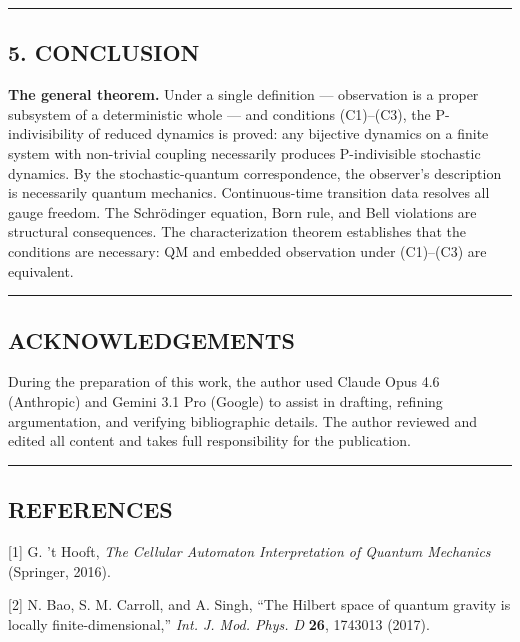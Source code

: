 \documentclass[
]{article}
\begin{document}
\begin{center}\rule{0.5\linewidth}{0.5pt}\end{center}

\hypertarget{conclusion}{%
\subsection{5. CONCLUSION}\label{conclusion}}

\textbf{The general theorem.} Under a single definition --- observation
is a proper subsystem of a deterministic whole --- and conditions
(C1)--(C3), the P-indivisibility of reduced dynamics is proved: any
bijective dynamics on a finite system with non-trivial coupling
necessarily produces P-indivisible stochastic dynamics. By the
stochastic-quantum correspondence, the observer's description is
necessarily quantum mechanics. Continuous-time transition data resolves
all gauge freedom. The Schrödinger equation, Born rule, and Bell
violations are structural consequences. The characterization theorem
establishes that the conditions are necessary: QM and embedded
observation under (C1)--(C3) are equivalent.

\begin{center}\rule{0.5\linewidth}{0.5pt}\end{center}

\hypertarget{acknowledgements}{%
\subsection{ACKNOWLEDGEMENTS}\label{acknowledgements}}

During the preparation of this work, the author used Claude Opus 4.6
(Anthropic) and Gemini 3.1 Pro (Google) to assist in drafting, refining
argumentation, and verifying bibliographic details. The author reviewed
and edited all content and takes full responsibility for the
publication.

\begin{center}\rule{0.5\linewidth}{0.5pt}\end{center}

\hypertarget{references}{%
\subsection{REFERENCES}\label{references}}

{[}1{]} G. 't Hooft, \emph{The Cellular Automaton Interpretation of
Quantum Mechanics} (Springer, 2016).

{[}2{]} N. Bao, S. M. Carroll, and A. Singh, ``The Hilbert space of
quantum gravity is locally finite-dimensional,'' \emph{Int. J. Mod.
Phys. D} \textbf{26}, 1743013 (2017).
\end{document}
